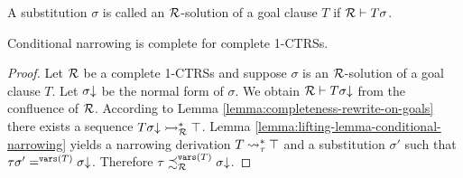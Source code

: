 \begin{definition}\label{definition:CTRS-sub-solution}
    A substitution $\sigma$ is called an $\mathcal{R}$-solution of a goal clause $T$ if $\mathcal{R} \vdash T\sigma$.
\end{definition}

\begin{theorem}
    Conditional narrowing is complete for complete 1-CTRSs.
    \begin{proof}
        Let $\mathcal{R}$ be a complete 1-CTRSs and suppose $\sigma$ is an $\mathcal{R}$-solution of a goal clause $T$. Let $\sigma\mathord{\downarrow}$ be the normal form of $\sigma$. We obtain $\mathcal{R} \vdash T \sigma\mathord{\downarrow}$ from the confluence of $\mathcal{R}$. According to Lemma \ref{lemma:completeness-rewrite-on-goals} there exists a sequence $T \sigma\mathord{\downarrow} \rightarrowtail^*_{\mathcal{R}} \top$. Lemma \ref{lemma:lifting-lemma-conditional-narrowing} yields a narrowing derivation $T \mathbin{\rightsquigarrow}^*_\tau \top$ and a substitution $\sigma'$ such that $\tau \sigma' =^{\mathtt{vars}(T)} \sigma\mathord{\downarrow}$. Therefore $\tau \iqoless[\trs][\vars{T}] \trsNF{\sigma}$.
    \end{proof}
\end{theorem}

